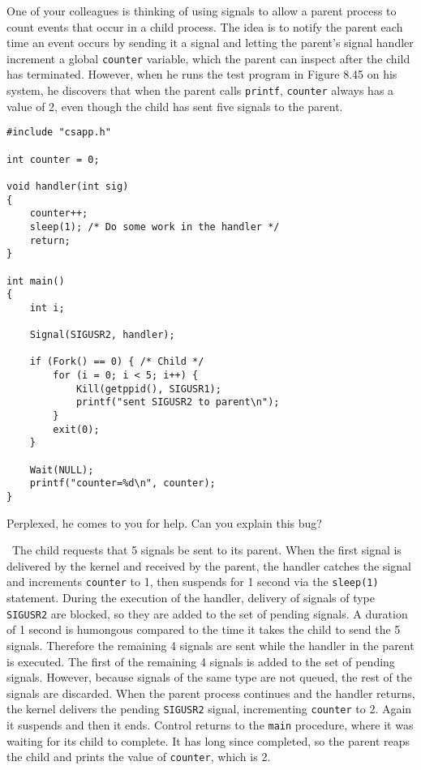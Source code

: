 \documentclass[12pt]{article}
\newenvironment{ex}[2][Exercise]{\begin{trivlist}
		\item[\hskip \labelsep {\bfseries #1}\hskip \labelsep {\bfseries #2.}]}{\end{trivlist}}
\newenvironment{sol}[1][Solution]{\begin{trivlist}
		\item[\hskip \labelsep {\bfseries #1:}]}{\end{trivlist}}
\begin{document}
\begin{ex}{8.23}
	One of your colleagues is thinking of using signals to allow a parent process to count events that
	occur in a child process. The idea is to notify the parent each time an event occurs by sending
	it a signal and letting the parent's signal handler increment a global \texttt{counter} variable,
	which the parent can inspect after the child has terminated. However, when he runs the test program
	in Figure 8.45 on his system, he discovers that when the parent calls \texttt{printf}, \texttt{counter}
	always has a value of 2, even though the child has sent five signals to the parent.
	
	\begin{lstlisting}
#include "csapp.h"

int counter = 0;

void handler(int sig)
{
	counter++;
	sleep(1); /* Do some work in the handler */
	return;
}

int main()
{
	int i;
	
	Signal(SIGUSR2, handler);
	
	if (Fork() == 0) { /* Child */
		for (i = 0; i < 5; i++) {
			Kill(getppid(), SIGUSR1);
			printf("sent SIGUSR2 to parent\n");
		}
		exit(0);
	}
	
	Wait(NULL);
	printf("counter=%d\n", counter);
}
	\end{lstlisting}	
	Perplexed, he comes to you for help. Can you explain this bug?
\end{ex}

\begin{sol}
	\
	The child requests that 5 signals be sent to its parent. When the first signal is delivered
	by the kernel and received by the parent, the handler catches the signal and increments
	\texttt{counter} to 1, then suspends for 1 second via the \texttt{sleep(1)} statement.
	During the execution of the handler, delivery of signals of type \texttt{SIGUSR2} are blocked,
	so they are added to the set of pending signals. A duration of 1 second is humongous compared
	to the time it takes the child to send the 5 signals. Therefore the remaining 4 signals are sent
	while the handler in the parent is executed. The first of the remaining 4 signals is added to
	the set of pending signals. However, because signals of the same type are not queued, the rest
	of the signals are discarded. When the parent process continues and the handler returns,
	the kernel delivers the pending \texttt{SIGUSR2} signal, incrementing \texttt{counter} to 2.
	Again it suspends and then it ends. Control returns to the \texttt{main} procedure, where it
	was waiting for its child to complete. It has long since completed, so the parent reaps the
	child and prints the value of \texttt{counter}, which is 2.
\end{sol}
\end{document}
